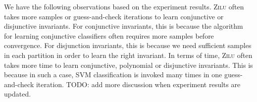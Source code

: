 
We have the following observations based on the experiment results. \textsc{Zilu} often takes more samples or guess-and-check iterations to learn conjunctive or disjunctive invariants. For conjunctive invariants, this is because the algorithm~\cite{sharma2012interpolants} for learning conjunctive classifiers often requires more samples before convergence. For disjunction invariants, this is because we need sufficient samples in each partition in order to learn the right invariant. In terms of time, \textsc{Zilu} often takes more time to learn conjunctive, polynomial or disjunctive invariants. This is because in such a case, SVM classification is invoked many times in one guess-and-check iteration. TODO: add more discussion when experiment results are updated.

